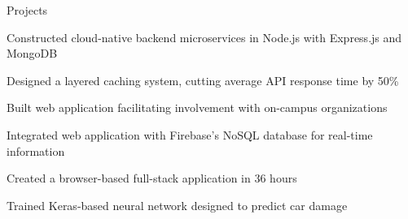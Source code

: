 \documentclass{resume} %
\begin{document}
\begin{rSection}{Projects}

\begin{rList}
\item Constructed cloud-native backend microservices in Node.js with Express.js
    and MongoDB
\item Designed a layered caching system, cutting average API response time by
    50\%
\end{rList}
\vspace{0.5em}


\begin{rList}
\item Built web application facilitating involvement with on-campus 
    organizations
\item Integrated web application with Firebase’s NoSQL database for real-time
    information
\end{rList}
\vspace{0.5em}


\begin{rList}
\item Created a browser-based full-stack application in 36 hours
\item Trained Keras-based neural network designed to predict car damage
\end{rList}

\end{rSection}

\end{document}
